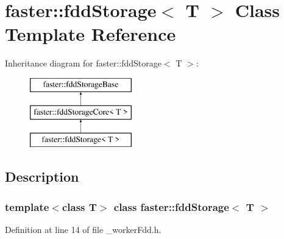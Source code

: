 \hypertarget{classfaster_1_1fddStorage}{}\section{faster\+:\+:fdd\+Storage$<$ T $>$ Class Template Reference}
\label{classfaster_1_1fddStorage}
Inheritance diagram for faster\+:\+:fdd\+Storage$<$ T $>$\+:\begin{figure}[H]
\begin{center}
\leavevmode
\includegraphics[height=3.000000cm]{classfaster_1_1fddStorage}
\end{center}
\end{figure}


\subsection{Description}
\subsubsection*{template$<$class T$>$\newline
class faster\+::fdd\+Storage$<$ T $>$}



Definition at line 14 of file \+\_\+worker\+Fdd.\+h.

